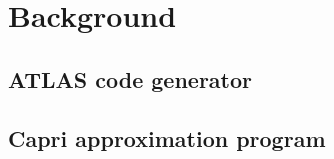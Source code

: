 \section{Background}
\label{sec:background}

  \subsection{ATLAS code generator}
  \label{sec:atlas_intro}

  \subsection{Capri approximation program}
  \label{sec:Capri_intro}
